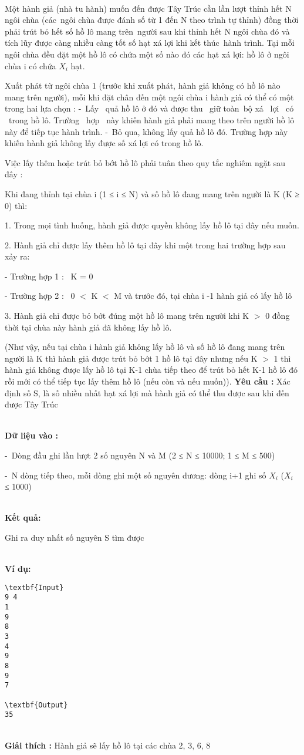 

 

Một hành giả (nhà tu hành) muốn đến được Tây Trúc cần lần lượt thỉnh hết N ngôi chùa (các ngôi chùa được đánh số từ 1 đến N theo trình tự thỉnh) đồng thời phải trút bỏ hết số hồ lô mang trên người sau khi thỉnh hết N ngôi chùa đó và tích lũy được càng nhiều càng tốt số hạt xá lợi khi kết thúc hành trình. Tại mỗi ngôi chùa đều đặt một hồ lô có chứa một số nào đó các hạt xá lợi: hồ lô ở ngôi  chùa i có chứa $X_{i}$ hạt.

Xuất phát từ ngôi chùa 1 (trước khi xuất phát, hành giả không có hồ lô nào mang trên người), mỗi khi đặt chân đến một ngôi chùa i hành giả có thể có một trong hai lựa chọn : - Lấy  quả hồ lô ở đó và được thu  giữ toàn bộ xá  lợi  có  trong hồ lô. Trường  hợp  này khiến hành giả phải mang theo trên người hồ lô này để tiếp tục hành trình. - Bỏ qua, không lấy quả hồ lô đó. Trường hợp này khiến hành giả không lấy được số xá lợi có trong hồ lô.

Việc lấy thêm hoặc trút bỏ bớt hồ lô phải tuân theo quy tắc nghiêm ngặt sau đây :

Khi đang thỉnh tại chùa i (1 ≤ i ≤ N) và số hồ lô đang mang trên người là K (K ≥ 0) thì:

1. Trong mọi tình huống, hành giả được quyền không lấy hồ lô tại đây nếu muốn.

2. Hành giả chỉ được lấy thêm hồ lô tại đây khi một trong hai trường hợp sau xảy ra:

- Trường hợp 1 :  K = 0

- Trường hợp 2 :  0 $<$ K $<$ M và trước đó, tại chùa i -1 hành giả có lấy hồ lô

3. Hành giả chỉ được bỏ bớt đúng một hồ lô mang trên người khi K $>$ 0 đồng thời tại chùa này hành giả đã không lấy hồ lô.

(Như vậy, nếu tại chùa i hành giả không lấy hồ lô và số hồ lô đang mang trên người là K thì hành giả được trút bỏ bớt 1 hồ lô tại đây nhưng nếu K $>$ 1 thì hành giả không được lấy hồ lô tại K-1 chùa tiếp theo để trút bỏ hết K-1 hồ lô đó rồi mới có thể tiếp tục lấy thêm hồ lô (nếu còn và nếu muốn)). \textbf{ Yêu cầu : } Xác định số S, là số nhiều nhất hạt xá lợi mà hành giả có thể thu được sau khi đến được Tây Trúc


\\\textbf{Dữ liệu vào :}

- Dòng đầu ghi lần lượt 2 số nguyên N và M (2 ≤ N ≤ 10000; 1 ≤ M ≤ 500)

- N dòng tiếp theo, mỗi dòng ghi một số nguyên dương: dòng i+1 ghi số $X_{i}$ ($X_{i}$ ≤ 1000)


\\\textbf{Kết quả:}

Ghi ra duy nhất số nguyên S tìm được


\\\textbf{Ví dụ:}
\begin{verbatim}
\textbf{Input}
9 4
1
9
8
3
4
9
8
9
7

\textbf{Output}
35\end{verbatim}


\\\textbf{Giải thích : } Hành giả sẽ lấy hồ lô tại các chùa 2, 3, 6, 8
